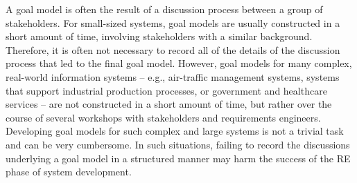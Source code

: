 


A goal model is often the result of a discussion process between a group of stakeholders. For small-sized systems, goal models are usually constructed in a short amount of time, involving stakeholders with a similar background. Therefore, it is often not necessary to record all of the details of the discussion process that led to the final goal model. However, goal models for many complex, real-world information systems -- e.g., air-traffic management systems, systems that support industrial production processes, or government and healthcare services -- are not constructed in a short amount of time, but rather over the course of several workshops with stakeholders and requirements engineers.  %
Developing goal models for such complex and large systems is not a trivial task and can be very cumbersome. In such situations, failing to record the discussions underlying a goal model in a structured manner may harm the success of the RE phase of system development. 

